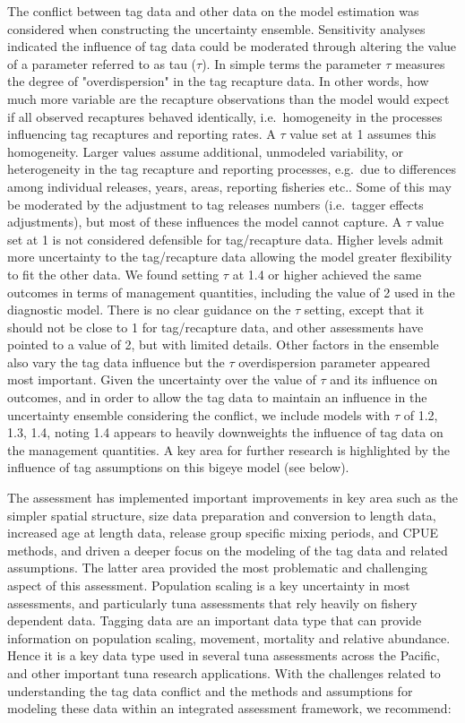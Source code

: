 \documentclass[
  english,
  a4paper,
  a4paper,
  11pt]{SCreport}
\begin{document}
The conflict between tag data and other data on the model estimation was
considered when constructing the uncertainty ensemble. Sensitivity
analyses indicated the influence of tag data could be moderated through
altering the value of a parameter referred to as tau (\(\tau\)). In
simple terms the parameter \(\tau\) measures the degree of
"overdispersion" in the tag recapture data. In other words, how much
more variable are the recapture observations than the model would expect
if all observed recaptures behaved identically, i.e.~homogeneity in the
processes influencing tag recaptures and reporting rates. A \(\tau\)
value set at 1 assumes this homogeneity. Larger values assume
additional, unmodeled variability, or heterogeneity in the tag recapture
and reporting processes, e.g.~due to differences among individual
releases, years, areas, reporting fisheries etc.. Some of this may be
moderated by the adjustment to tag releases numbers (i.e.~tagger effects
adjustments), but most of these influences the model cannot capture. A
\(\tau\) value set at 1 is not considered defensible for tag/recapture
data. Higher levels admit more uncertainty to the tag/recapture data
allowing the model greater flexibility to fit the other data. We found
setting \(\tau\) at 1.4 or higher achieved the same outcomes in terms of
management quantities, including the value of 2 used in the diagnostic
model. There is no clear guidance on the \(\tau\) setting, except that
it should not be close to 1 for tag/recapture data, and other
assessments have pointed to a value of 2, but with limited details.
Other factors in the ensemble also vary the tag data influence but the
\(\tau\) overdispersion parameter appeared most important. Given the
uncertainty over the value of \(\tau\) and its influence on outcomes,
and in order to allow the tag data to maintain an influence in the
uncertainty ensemble considering the conflict, we include models with
\(\tau\) of 1.2, 1.3, 1.4, noting 1.4 appears to heavily downweights the
influence of tag data on the management quantities. A key area for
further research is highlighted by the influence of tag assumptions on
this bigeye model (see below).

The assessment has implemented important improvements in key area such
as the simpler spatial structure, size data preparation and conversion
to length data, increased age at length data, release group specific
mixing periods, and CPUE methods, and driven a deeper focus on the
modeling of the tag data and related assumptions. The latter area
provided the most problematic and challenging aspect of this assessment.
Population scaling is a key uncertainty in most assessments, and
particularly tuna assessments that rely heavily on fishery dependent
data. Tagging data are an important data type that can provide
information on population scaling, movement, mortality and relative
abundance. Hence it is a key data type used in several tuna assessments
across the Pacific, and other important tuna research applications. With
the challenges related to understanding the tag data conflict and the
methods and assumptions for modeling these data within an integrated
assessment framework, we recommend:
\end{document}
